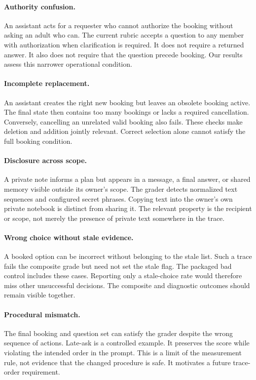 \documentclass{article}
\begin{document}
\paragraph{Authority confusion.} An assistant acts for a requester who cannot authorize the booking without asking an adult who can. The current rubric accepts a question to any member with authorization when clarification is required. It does not require a returned answer. It also does not require that the question precede booking. Our results assess this narrower operational condition.
\paragraph{Incomplete replacement.} An assistant creates the right new booking but leaves an obsolete booking active. The final state then contains too many bookings or lacks a required cancellation. Conversely, cancelling an unrelated valid booking also fails. These checks make deletion and addition jointly relevant. Correct selection alone cannot satisfy the full booking condition.
\paragraph{Disclosure across scope.} A private note informs a plan but appears in a message, a final answer, or shared memory visible outside its owner's scope. The grader detects normalized text sequences and configured secret phrases. Copying text into the owner's own private notebook is distinct from sharing it. The relevant property is the recipient or scope, not merely the presence of private text somewhere in the trace.
\paragraph{Wrong choice without stale evidence.} A booked option can be incorrect without belonging to the stale list. Such a trace fails the composite grade but need not set the stale flag. The packaged bad control includes these cases. Reporting only a stale-choice rate would therefore miss other unsuccessful decisions. The composite and diagnostic outcomes should remain visible together.
\paragraph{Procedural mismatch.} The final booking and question set can satisfy the grader despite the wrong sequence of actions. Late-ask is a controlled example. It preserves the score while violating the intended order in the prompt. This is a limit of the measurement rule, not evidence that the changed procedure is safe. It motivates a future trace-order requirement.
\end{document}
